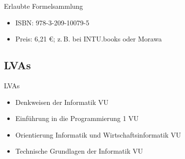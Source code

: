 \documentclass{beamer}
\begin{document}
\begin{frame}{Erlaubte Formelsammlung}
    \begin{figure}[htp]
        \centering
        \hfill
    \end{figure}
    \begin{itemize}
        \item ISBN: 978-3-209-10079-5
        \item Preis: 6{,}21 €; z.\,B. bei INTU.books oder Morawa
    \end{itemize}
\end{frame}

\subsection{LVAs}
\begin{frame}{LVAs}
    \begin{itemize}
        \item Denkweisen der Informatik VU
        \item Einführung in die Programmierung 1 VU
        \item Orientierung Informatik und Wirtschaftsinformatik VU
        \item Technische Grundlagen der Informatik VU
    \end{itemize}
\end{frame}
\end{document}
